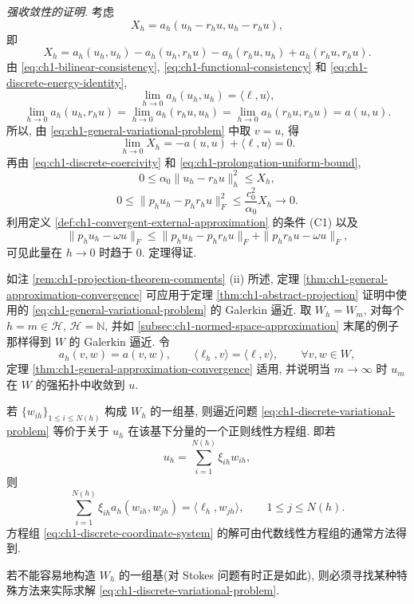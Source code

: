 \begin{Proof}
\emph{强收敛性的证明.} 考虑
\[
X_h=a_h(u_h-r_hu,u_h-r_hu),
\]
即
\[
X_h=a_h(u_h,u_h)-a_h(u_h,r_hu)-a_h(r_hu,u_h)+a_h(r_hu,r_hu).
\]
由 \eqref{eq:ch1-bilinear-consistency}, \eqref{eq:ch1-functional-consistency} 和 \eqref{eq:ch1-discrete-energy-identity},
\[
\lim_{h\to0}a_h(u_h,u_h)=\langle\ell,u\rangle,
\]
\[
\lim_{h\to0}a_h(u_h,r_hu)
=\lim_{h\to0}a_h(r_hu,u_h)
=\lim_{h\to0}a_h(r_hu,r_hu)
=a(u,u).
\]
所以, 由 \eqref{eq:ch1-general-variational-problem} 中取 $v=u$, 得
\begin{equation}
\lim_{h\to0}X_h=-a(u,u)+\langle\ell,u\rangle=0.
\label{eq:ch1-strong-convergence-x-limit}
\end{equation}
再由 \eqref{eq:ch1-discrete-coercivity} 和 \eqref{eq:ch1-prolongation-uniform-bound},
\[
0\leq\alpha_0\|u_h-r_hu\|_h^2\leq X_h,
\]
\[
0\leq\|p_hu_h-p_hr_hu\|_F^2\leq\frac{c_0^2}{\alpha_0}X_h\to0.
\]
利用定义 \ref{def:ch1-convergent-external-approximation} 的条件 (C1) 以及
\[
\|p_hu_h-\omega u\|_F
\leq\|p_hu_h-p_hr_hu\|_F+\|p_hr_hu-\omega u\|_F,
\]
可见此量在 $h\to0$ 时趋于 $0$. 定理得证.
\end{Proof}

\begin{Remark}
\label{rem:ch1-general-theorem-galerkin}
如注 \ref{rem:ch1-projection-theorem-comments} (ii) 所述, 定理 \ref{thm:ch1-general-approximation-convergence} 可应用于定理 \ref{thm:ch1-abstract-projection} 证明中使用的 \eqref{eq:ch1-general-variational-problem} 的 Galerkin 逼近. 取 $W_h=W_m$, 对每个 $h=m\in\mathcal H$, $\mathcal H=\mathbb N$, 并如 \ref{subsec:ch1-normed-space-approximation} 末尾的例子那样得到 $W$ 的 Galerkin 逼近. 令
\[
a_h(v,w)=a(v,w),\qquad
\langle\ell_h,v\rangle=\langle\ell,v\rangle,\qquad\forall v,w\in W,
\]
定理 \ref{thm:ch1-general-approximation-convergence} 适用, 并说明当 $m\to\infty$ 时 $u_m$ 在 $W$ 的强拓扑中收敛到 $u$.
\end{Remark}

\begin{Remark}
\label{rem:ch1-discrete-linear-system}
若 $\{w_{ih}\}_{1\leq i\leq N(h)}$ 构成 $W_h$ 的一组基, 则逼近问题 \eqref{eq:ch1-discrete-variational-problem} 等价于关于 $u_h$ 在该基下分量的一个正则线性方程组. 即若
\[
u_h=\sum_{i=1}^{N(h)}\xi_{ih}w_{ih},
\]
则
\begin{equation}
\sum_{i=1}^{N(h)}\xi_{ih}a_h(w_{ih},w_{jh})
=\langle\ell_h,w_{jh}\rangle,\qquad1\leq j\leq N(h).
\label{eq:ch1-discrete-coordinate-system}
\end{equation}
方程组 \eqref{eq:ch1-discrete-coordinate-system} 的解可由代数线性方程组的通常方法得到.

若不能容易地构造 $W_h$ 的一组基(对 Stokes 问题有时正是如此), 则必须寻找某种特殊方法来实际求解 \eqref{eq:ch1-discrete-variational-problem}.
\end{Remark}

